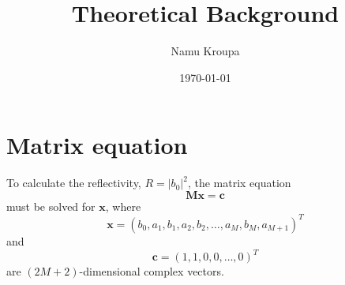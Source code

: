 \documentclass[]{article}
\title{Theoretical Background}
\author{Namu Kroupa}
\date{\today}
\begin{document}
	\maketitle
	
	\section{Matrix equation}
	To calculate the reflectivity, $R=|b_0|^2$, the matrix equation 
	\begin{equation}\label{eqn:matrix-equation}
		\mathbf{M}\mathbf{x}=\mathbf{c}
	\end{equation}
	must be solved for $\mathbf{x}$, where
	\begin{equation}
		\mathbf{x}=(b_0,a_1,b_1,a_2,b_2,\dots,a_M,b_M,a_{M+1})^T
	\end{equation}
	and
	\begin{equation}
		\mathbf{c}=(1,1,0,0,\dots,0)^T
	\end{equation}
	are $(2M+2)$-dimensional complex vectors.
	
\end{document}

